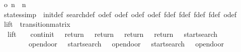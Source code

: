 \begin{isabellebody}
\isanewline
{}\isamarkupfalse%
\ {\isachardoublequoteopen}o\ n\ {\isacharequal}\ n\ {\isacharplus}\ {}{\isachardoublequoteclose}\isanewline
\isanewline
{}\isamarkupfalse%
\ states{\isacharbrackleft}simp{\isacharbrackright}\ {\isacharequal}\ init{\isacharunderscore}def\ search{\isacharunderscore}def\ o{}{\isacharunderscore}def\ o{}{\isacharunderscore}def\ o{}{\isacharunderscore}def\ o{}{\isacharunderscore}def\ f{}{\isacharunderscore}def\ f{}{\isacharunderscore}def\ f{}{\isacharunderscore}def\ f{}{\isacharunderscore}def\ o{\isacharunderscore}def\isanewline
\isanewline
{}\isamarkupfalse%
\ lift\ {\isacharcolon}{\isacharcolon}\ transition{\isacharunderscore}matrix\ \isanewline
\ \ {\isachardoublequoteopen}lift\ {\isacharequal}\ {\isacharbraceleft}{\isacharbar}{\isacharparenleft}{\isacharparenleft}{}{\isacharcomma}\ {}{\isacharparenright}{\isacharcomma}\ continit{\isacharparenright}{\isacharcomma}\ {\isacharparenleft}{\isacharparenleft}{}{\isacharcomma}\ {}{\isacharparenright}{\isacharcomma}\ return{}{\isacharparenright}{\isacharcomma}\ {\isacharparenleft}{\isacharparenleft}{}{\isacharcomma}\ {}{\isacharparenright}{\isacharcomma}\ return{}{\isacharparenright}{\isacharcomma}\ {\isacharparenleft}{\isacharparenleft}{}{\isacharcomma}\ {}{\isacharparenright}{\isacharcomma}\ return{}{\isacharparenright}{\isacharcomma}\ {\isacharparenleft}{\isacharparenleft}{}{\isacharcomma}\ {}{\isacharparenright}{\isacharcomma}\ return{}{\isacharparenright}{\isacharcomma}\ {\isacharparenleft}{\isacharparenleft}{}{\isacharcomma}\ {}{\isacharparenright}{\isacharcomma}\ startsearch{\isacharparenright}{\isacharcomma}\isanewline
\ \ \ \ \ \ {\isacharparenleft}{\isacharparenleft}{}{\isacharcomma}\ {}{\isacharparenright}{\isacharcomma}\ opendoor{}{\isacharparenright}{\isacharcomma}\ {\isacharparenleft}{\isacharparenleft}{}{\isacharcomma}\ {}{\isacharparenright}{\isacharcomma}\ startsearch{\isacharparenright}{\isacharcomma}\ {\isacharparenleft}{\isacharparenleft}{}{\isacharcomma}\ {}{\isacharparenright}{\isacharcomma}\ opendoor{}{\isacharparenright}{\isacharcomma}\ {\isacharparenleft}{\isacharparenleft}{}{\isacharcomma}\ {}{\isacharparenright}{\isacharcomma}\ startsearch{\isacharparenright}{\isacharcomma}\ {\isacharparenleft}{\isacharparenleft}{}{\isacharcomma}\ {}{\isacharparenright}{\isacharcomma}\ opendoor{}{\isacharparenright}{\isacharcomma}\isanewline

\end{isabellebody}
